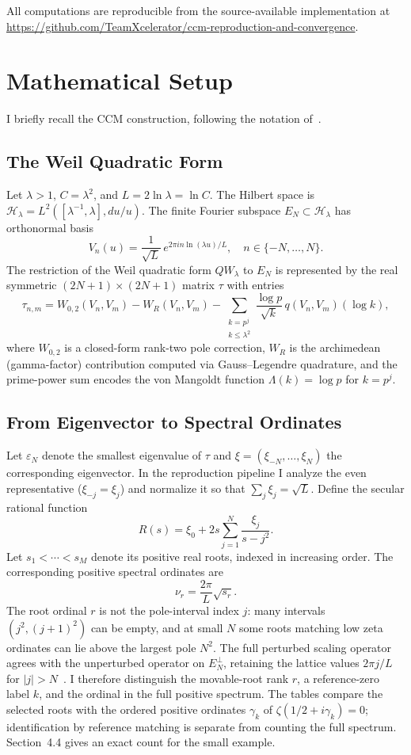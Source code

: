 \documentclass[11pt,a4paper]{article}
\begin{document}
All computations are reproducible from the source-available
implementation at
\url{https://github.com/TeamXcelerator/ccm-reproduction-and-convergence}.

\section{Mathematical Setup}

I briefly recall the CCM construction, following the notation
of~\cite{CCM2025}.

\subsection{The Weil Quadratic Form}

Let $\lambda > 1$, $C=\lambda^2$, and $L = 2\ln\lambda=\ln C$. The Hilbert space is
$\mathcal{H}_\lambda = L^2([\lambda^{-1}, \lambda], du/u)$.
The finite Fourier subspace $E_N\subset\mathcal{H}_\lambda$ has
orthonormal basis
\[
V_n(u) = \frac{1}{\sqrt{L}}\,
e^{2\pi i n \ln(\lambda u)/L}, \quad
n \in \{-N, \ldots, N\}.
\]
The restriction of the Weil quadratic form $QW_\lambda$ to $E_N$
is represented by the real symmetric $(2N{+}1)\times(2N{+}1)$
matrix $\tau$ with entries
\[
\tau_{n,m} = W_{0,2}(V_n, V_m) - W_R(V_n, V_m)
- \sum_{\substack{k = p^j \\ k \leq \lambda^2}}
\frac{\log p}{\sqrt{k}}\, q(V_n, V_m)(\log k),
\]
where $W_{0,2}$ is a closed-form rank-two pole correction,
$W_R$ is the archimedean (gamma-factor) contribution computed
via Gauss--Legendre quadrature, and the prime-power sum encodes
the von Mangoldt function $\Lambda(k) = \log p$ for $k = p^j$.

\subsection{From Eigenvector to Spectral Ordinates}

Let $\varepsilon_N$ denote the smallest eigenvalue of $\tau$ and
$\xi=(\xi_{-N},\ldots,\xi_N)$ the corresponding eigenvector. In the
reproduction pipeline I analyze the even representative
($\xi_{-j}=\xi_j$) and normalize it so that
$\sum_j\xi_j=\sqrt{L}$. Define the secular rational function
\[
R(s)=\xi_0+2s\sum_{j=1}^{N}\frac{\xi_j}{s-j^2}.
\]
Let $s_1<\cdots<s_M$ denote its positive real roots, indexed in
increasing order. The corresponding positive spectral ordinates are
\[
\nu_r=\frac{2\pi}{L}\sqrt{s_r}.
\]
The root ordinal $r$ is not the pole-interval index $j$: many
intervals $(j^2,(j+1)^2)$ can be empty, and at small $N$ some roots
matching low zeta ordinates can lie above the largest pole $N^2$.
The full perturbed scaling operator agrees with the unperturbed
operator on $E_N^\perp$, retaining the lattice values
$2\pi j/L$ for $|j|>N$~\cite[Proposition~5.7]{CCM2025}.
I therefore distinguish the movable-root rank $r$, a reference-zero
label $k$, and the ordinal in the full positive spectrum. The tables
compare the selected roots with the ordered positive ordinates
$\gamma_k$ of $\zeta(1/2+i\gamma_k)=0$; identification by reference
matching is separate from counting the full spectrum. Section~4.4 gives
an exact count for the small example.
\end{document}
